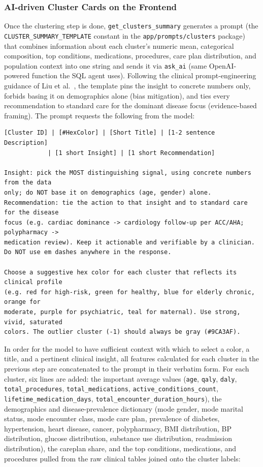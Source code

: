 \subsubsection*{AI-driven Cluster Cards on the Frontend}

Once the clustering step is done, \texttt{get\_clusters\_summary} generates a prompt (the \texttt{CLUSTER\_SUMMARY\_TEMPLATE} constant in the \texttt{app/prompts/clusters} package) that combines information about each cluster’s numeric mean, categorical composition, top conditions, medications, procedures, care plan distribution, and population context into one string and sends it via \texttt{ask\_ai} (same OpenAI-powered function the SQL agent uses). Following the clinical prompt-engineering guidance of Liu et al.~\cite{liu2025}, the template pins the insight to concrete numbers only, forbids basing it on demographics alone (bias mitigation), and ties every recommendation to standard care for the dominant disease focus (evidence-based framing). The prompt requests the following from the model:

\begin{lstlisting}[style=pythonstyle]
[Cluster ID] | [#HexColor] | [Short Title] | [1-2 sentence Description]
            | [1 short Insight] | [1 short Recommendation]

Insight: pick the MOST distinguishing signal, using concrete numbers from the data
only; do NOT base it on demographics (age, gender) alone.
Recommendation: tie the action to that insight and to standard care for the disease
focus (e.g. cardiac dominance -> cardiology follow-up per ACC/AHA; polypharmacy ->
medication review). Keep it actionable and verifiable by a clinician.
Do NOT use em dashes anywhere in the response.

Choose a suggestive hex color for each cluster that reflects its clinical profile
(e.g. red for high-risk, green for healthy, blue for elderly chronic, orange for
moderate, purple for psychiatric, teal for maternal). Use strong, vivid, saturated
colors. The outlier cluster (-1) should always be gray (#9CA3AF).
\end{lstlisting}

In order for the model to have sufficient context with which to select a color, a title, and a pertinent clinical insight, all features calculated for each cluster in the previous step are concatenated to the prompt in their verbatim form. For each cluster, six lines are added: the important average values (\texttt{age}, \texttt{qaly}, \texttt{daly}, \texttt{total\_procedures}, \texttt{total\_medications}, \texttt{active\_\allowbreak conditions\_\allowbreak count}, \texttt{lifetime\_\allowbreak medication\_\allowbreak days}, \texttt{total\_\allowbreak encounter\_\allowbreak duration\_\allowbreak hours}), the demographics and disease-prevalence dictionary (mode gender, mode marital status, mode encounter class, mode care plan, prevalence of diabetes, hypertension, heart disease, cancer, polypharmacy, BMI distribution, BP distribution, glucose distribution, substance use distribution, readmission distribution), the careplan share, and the top conditions, medications, and procedures pulled from the raw clinical tables joined onto the cluster labels:

